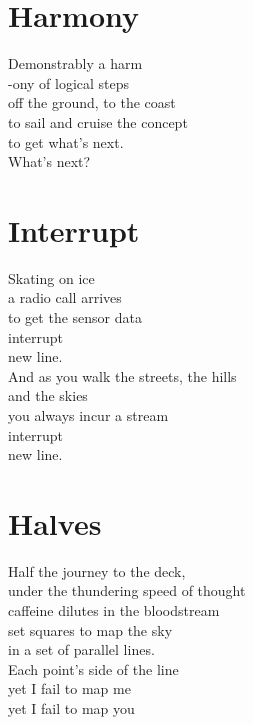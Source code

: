 \documentclass[a4paper,twoside, openany]{book}
\newenvironment{Verse}
  {\center\varwidth{\linewidth}\fontsize{18}{21.6}\selectfont}
  {\endvarwidth\endcenter}
\begin{document}
\chapter{Harmony}
\begin{Verse}
Demonstrably a harm\\
-ony of logical steps\\
off the ground, to the coast\\
to sail and cruise the concept\\
to get what's next.\\
What's next?
\end{Verse}
\chapter{Interrupt}
\begin{Verse}
Skating on ice\\
a radio call arrives\\
to get the sensor data\\
interrupt\\
new line.\\
And as you walk the streets, the hills\\
and the skies\\
you always incur a stream\\
interrupt\\
new line.\\
\end{Verse}
\chapter{Halves}
\begin{Verse}
Half the journey to the deck,\\
under the thundering speed of thought\\
caffeine dilutes in the bloodstream\\
set squares to map the sky\\
in a set of parallel lines.\\
Each point's side of the line\\
yet I fail to map me\\
yet I fail to map you
\end{Verse}
\end{document}
